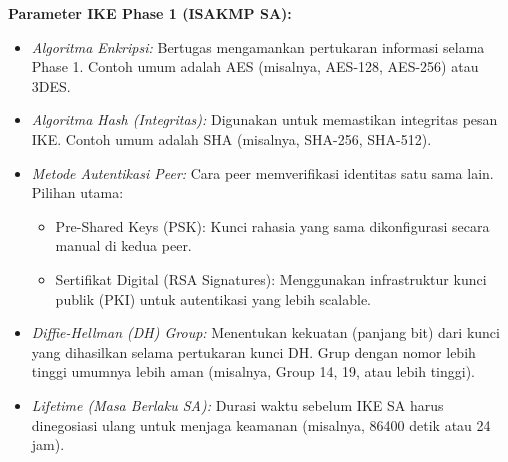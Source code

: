 \begin{enumerate}
\begin{itemize}
        \textbf{Parameter IKE Phase 1 (ISAKMP SA):}
        \begin{itemize}
            \item \textit{Algoritma Enkripsi:} Bertugas mengamankan pertukaran informasi selama Phase 1. Contoh umum adalah AES (misalnya, AES-128, AES-256) atau 3DES.
            \item \textit{Algoritma Hash (Integritas):} Digunakan untuk memastikan integritas pesan IKE. Contoh umum adalah SHA (misalnya, SHA-256, SHA-512).
            \item \textit{Metode Autentikasi Peer:} Cara peer memverifikasi identitas satu sama lain. Pilihan utama:
                \begin{itemize}
                    \item Pre-Shared Keys (PSK): Kunci rahasia yang sama dikonfigurasi secara manual di kedua peer.
                    \item Sertifikat Digital (RSA Signatures): Menggunakan infrastruktur kunci publik (PKI) untuk autentikasi yang lebih scalable.
                \end{itemize}
            \item \textit{Diffie-Hellman (DH) Group:} Menentukan kekuatan (panjang bit) dari kunci yang dihasilkan selama pertukaran kunci DH. Grup dengan nomor lebih tinggi umumnya lebih aman (misalnya, Group 14, 19, atau lebih tinggi).
            \item \textit{Lifetime (Masa Berlaku SA):} Durasi waktu sebelum IKE SA harus dinegosiasi ulang untuk menjaga keamanan (misalnya, 86400 detik atau 24 jam).
        \end{itemize}
        

\end{itemize}
\end{enumerate}

